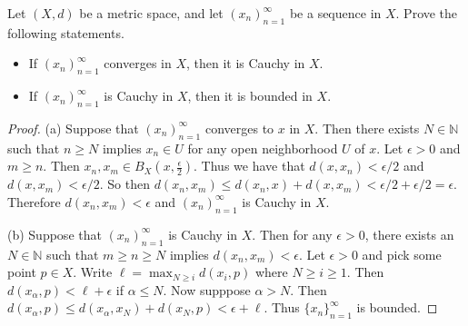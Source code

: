 \documentclass[10pt,reqno]{amsart}
\theoremstyle{definition}
\newcommand{\nn}{\mathbb N}
\begin{document}
\begin{tcolorbox}[colback=black!5!white,colframe=black!75!black,title= Chapter 4: Exercise $2.3.$] Let $(X, d)$ be a metric space, and let $(x_n)_{n=1}^\infty$ be a sequence in $X$. Prove the following statements.
\begin{itemize}
	\item [(a)] If $(x_n)_{n=1}^\infty$ converges in $X$, then it is Cauchy in $X$. 
	\item [(b)] If $(x_n)_{n=1}^\infty$ is Cauchy in $X$, then it is bounded in $X$.
\end{itemize}
\tcblower 
\begin{proof} 
(a) Suppose that $(x_n)_{n=1}^\infty$ converges to $x$ in $X$. Then there exists $N \in \nn$ such that $n \geq N$ implies $x_n \in U$ for any open neighborhood $U$ of $x$. Let $\epsilon > 0$ and $ m \geq n$. Then $x_n, x_m \in B_X(x, \frac{\epsilon}{2})$. Thus we have that $d(x,x_n)< \epsilon /2$ and $d(x, x_m) < \epsilon/2 $. So then $d(x_n, x_m) \leq d(x_n, x) + d(x, x_m) < \epsilon/2 + \epsilon/2 = \epsilon$. Therefore $d(x_n, x_m) <\epsilon$ and $(x_n)_{n=1}^\infty$ is Cauchy in $X$. 

(b) Suppose that $(x_n)_{n=1}^\infty$ is Cauchy in $X$. Then for any $\epsilon > 0$, there exists an $N \in \nn$ such that $m \geq n \geq N $ implies $d(x_n, x_m) < \epsilon$. Let $\epsilon > 0$ and pick some point $p \in X$. Write $\ell = \max_{N \geq i } d(x_i, p)$ where $N \geq i \geq 1$. Then $d(x_\alpha, p) < \ell + \epsilon$ if $\alpha \leq  N$. Now supppose $\alpha > N$. Then $d(x_\alpha, p) \leq d(x_\alpha, x_N) + d(x_N, p) < \epsilon + \ell $. Thus $\{x_n\}_{n=1}^\infty$ is bounded. 
\end{proof}

\end{tcolorbox}
\end{document}
